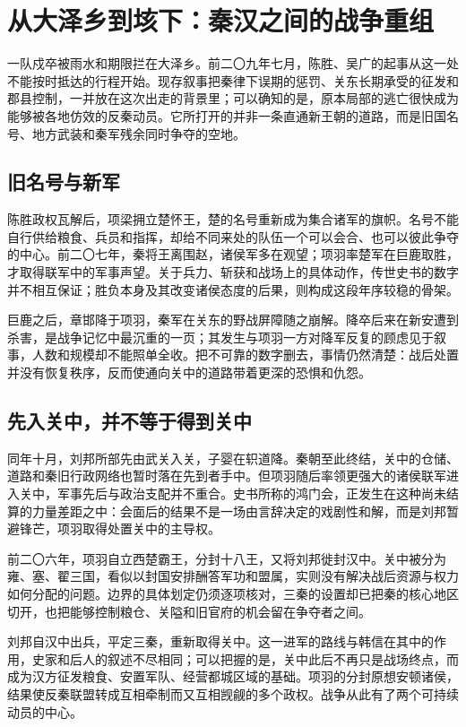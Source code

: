 \section{从大泽乡到垓下：秦汉之间的战争重组}

一队戍卒被雨水和期限拦在大泽乡。前二〇九年七月，陈胜、吴广的起事从这一处不能按时抵达的行程开始。现存叙事把秦律下误期的惩罚、关东长期承受的征发和郡县控制，一并放在这次出走的背景里；可以确知的是，原本局部的逃亡很快成为能够被各地仿效的反秦动员。它所打开的并非一条直通新王朝的道路，而是旧国名号、地方武装和秦军残余同时争夺的空地。

\subsection{旧名号与新军}

陈胜政权瓦解后，项梁拥立楚怀王，楚的名号重新成为集合诸军的旗帜。名号不能自行供给粮食、兵员和指挥，却给不同来处的队伍一个可以会合、也可以彼此争夺的中心。前二〇七年，秦将王离围赵，诸侯军多在观望；项羽率楚军在巨鹿取胜，才取得联军中的军事声望。关于兵力、斩获和战场上的具体动作，传世史书的数字并不相互保证；胜负本身及其改变诸侯态度的后果，则构成这段年序较稳的骨架。

巨鹿之后，章邯降于项羽，秦军在关东的野战屏障随之崩解。降卒后来在新安遭到杀害，是战争记忆中最沉重的一页；其发生与项羽一方对降军反复的顾虑见于叙事，人数和规模却不能照单全收。把不可靠的数字删去，事情仍然清楚：战后处置并没有恢复秩序，反而使通向关中的道路带着更深的恐惧和仇怨。

\subsection{先入关中，并不等于得到关中}

同年十月，刘邦所部先由武关入关，子婴在轵道降。秦朝至此终结，关中的仓储、道路和秦旧行政网络也暂时落在先到者手中。但项羽随后率领更强大的诸侯联军进入关中，军事先后与政治支配并不重合。史书所称的鸿门会，正发生在这种尚未结算的力量差距之中：会面后的结果不是一场由言辞决定的戏剧性和解，而是刘邦暂避锋芒，项羽取得处置关中的主导权。

前二〇六年，项羽自立西楚霸王，分封十八王，又将刘邦徙封汉中。关中被分为雍、塞、翟三国，看似以封国安排酬答军功和盟属，实则没有解决战后资源与权力如何分配的问题。边界的具体划定仍须逐项核对，三秦的设置却已把秦的核心地区切开，也把能够控制粮仓、关隘和旧官府的机会留在争夺者之间。

刘邦自汉中出兵，平定三秦，重新取得关中。这一进军的路线与韩信在其中的作用，史家和后人的叙述不尽相同；可以把握的是，关中此后不再只是战场终点，而成为汉方征发粮食、安置军队、经营都城区域的基础。项羽的分封原想安顿诸侯，结果使反秦联盟转成互相牵制而又互相觊觎的多个政权。战争从此有了两个可持续动员的中心。

